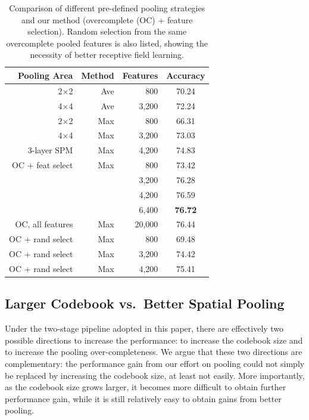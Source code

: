 \begin{table}
  \centering
  \begin{tabular}{r|r|r|c}
    \hline
    Pooling Area & Method & Features & Accuracy\\
    \hline
    2$\times$2 & Ave & 800 & 70.24\\
    4$\times$4 & Ave & 3,200 & 72.24\\
    2$\times$2 & Max & 800 & 66.31\\
    4$\times$4 & Max & 3,200 & 73.03\\
    3-layer SPM & Max & 4,200 & 74.83\\ %
    \hline
    OC + feat select & Max & 800 & 73.42\\
                  &     & 3,200 & 76.28\\
                  &     & 4,200 & 76.59\\
                  &     & 6,400 & {\bfseries 76.72}\\
    \hline
    OC, all features & Max & 20,000 & 76.44\\ %
    OC + rand select & Max & 800 & 69.48\\ %
    OC + rand select & Max & 3,200 & 74.42\\ %
    OC + rand select & Max & 4,200 & 75.41\\ %
    \hline
  \end{tabular}
  \caption{Comparison of different pre-defined pooling strategies and our method (overcomplete (OC) + feature selection). Random selection from the same overcomplete pooled features is also listed, showing the necessity of better receptive field learning.}\label{table:gridsize}
\end{table}

\subsection{Larger Codebook vs.\ Better Spatial Pooling}
Under the two-stage pipeline adopted in this paper, there are effectively two possible directions to increase the performance: to increase the codebook size and to increase the pooling over-completeness. We argue that these two directions are complementary: the performance gain from our effort on pooling could not simply be replaced by increasing the codebook size, at least not easily. More importantly, as the codebook size grows larger, it becomes more difficult to obtain further performance gain, while it is still relatively easy to obtain gains from better pooling.

